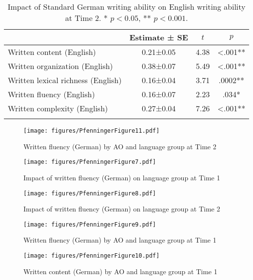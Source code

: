 \documentclass[output=paper,modfonts,nonflat,newtxmath]{langsci/langscibook}
\begin{document}
\begin{table}
\caption{\label{tab:pfenninger:11}Impact of Standard German writing ability on English writing ability at Time 2. * $p<0.05$, ** $p<0.001$.}
\begin{tabular}{lS[table-format=-1.3,parse-numbers=false]S[table-format=1.2]S[table-format=<1.4,table-space-text-post = ab]}
\lsptoprule
& {Estimate ± SE} & {$t$}  & {$p$}\\\midrule
Written content (English) & 0.21±0.05 & 4.38 & <.001**\\
Written organization (English) & 0.38±0.07 & 5.49 & <.001**\\
Written lexical richness (English) & 0.16±0.04 & 3.71 & .0002**\\
Written fluency (English) & 0.16±0.07 & 2.23 & .034*\\
Written complexity (English) & 0.27±0.04 & 7.26 & <.001**\\
\lspbottomrule
\end{tabular}
\end{table}

\begin{figure}%
\texttt{[image: figures/PfenningerFigure11.pdf]}
\caption{\label{fig:pfenninger:11} Written fluency (German) by AO and language group at Time 2}
\end{figure}


\begin{figure}%
\texttt{[image: figures/PfenningerFigure7.pdf]}
\caption{\label{fig:pfenninger:7}Impact of written fluency (German) on language group at Time 1}
\end{figure}

\begin{figure}%
\texttt{[image: figures/PfenningerFigure8.pdf]}
\caption{\label{fig:pfenninger:8} Impact of written fluency (German) on language group at Time 2}
\end{figure}


\begin{figure}%
\texttt{[image: figures/PfenningerFigure9.pdf]}
 \caption{\label{fig:pfenninger:9}Written fluency (German) by AO and language group at Time 1}
\end{figure}


\begin{figure}%
\texttt{[image: figures/PfenningerFigure10.pdf]}
\caption{\label{fig:pfenninger:10} Written content (German) by AO and language group at Time 1}
\end{figure}
\end{document}
